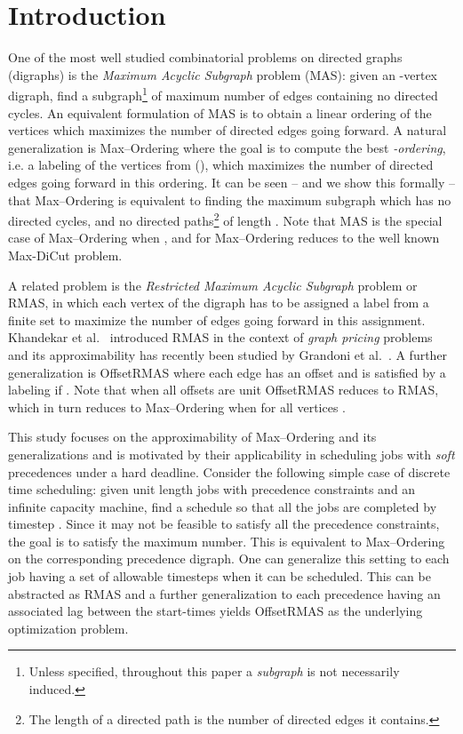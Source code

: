 \documentclass[oribibl]{llncs}
\newcommand{\mas}{{\sc MAS}\xspace}
\newcommand{\maxk}{{\sc Max--Ordering}\xspace}
\newcommand{\maxdi}{{\sc Max-DiCut}\xspace}
\newcommand{\rmas}{{\sc RMAS}\xspace}
\newcommand{\rmasoff}{{\sc OffsetRMAS}\xspace}
\begin{document}
\section{Introduction}
\label{sec:introduction}
One of the most well studied combinatorial problems on directed graphs
(digraphs)
is the \emph{Maximum Acyclic Subgraph} problem (\mas): given an -vertex digraph,
find a subgraph\footnote{Unless specified, throughout this
paper a \emph{subgraph} is not necessarily induced.} of maximum number 
of edges 
containing no directed cycles. 
 An equivalent formulation of \mas is to
obtain a linear ordering of the vertices which maximizes the number of directed
edges going forward. A natural generalization is \maxk
where the goal is to compute the best \emph{-ordering}, i.e. a labeling of
the vertices from  (), which
maximizes the number of directed edges going forward in this ordering.
It can be seen -- and we show this formally -- that \maxk is
equivalent to finding the maximum subgraph which has no directed
cycles, and no directed paths\footnote{The length of a directed path is
the number of directed edges it contains.} of length . Note that \mas is
the special case of \maxk when , and for  \maxk reduces to the
well known \maxdi problem. 

A related problem is the \emph{Restricted Maximum Acyclic Subgraph} problem or
\rmas, 
in which each vertex  of the digraph has
to be assigned a label from a finite set 
 to maximize the number of edges
going forward in this assignment. 
Khandekar et al.~\cite{khandekar2009hardness} 
introduced \rmas in the context of \emph{graph
pricing} problems and its approximability has recently 
been studied by Grandoni et al.~\cite{grandoni2015lp}. A further
generalization is \rmasoff where each edge  has an offset
 and is satisfied by a labeling  if
. Note that
when all offsets are unit \rmasoff reduces to \rmas, which in turn
reduces to \maxk when  for all vertices .

This study focuses on the approximability of \maxk and its
generalizations  and 
is motivated by their applicability
in scheduling jobs with \emph{soft} precedences under a hard deadline. 
Consider the following simple case
of discrete time scheduling: given  unit length jobs with precedence
constraints and an infinite capacity machine, find a schedule so that all the jobs
are completed by timestep . Since it may not be feasible to satisfy all
the precedence constraints, the goal is to satisfy the maximum number.
This is equivalent to \maxk on the corresponding precedence digraph.
One can generalize this setting to each job having a
set of allowable timesteps when it can be
scheduled. This can be abstracted as \rmas and a further
generalization to each
precedence having an associated lag between the start-times yields
\rmasoff as the underlying optimization problem.  
\end{document}
